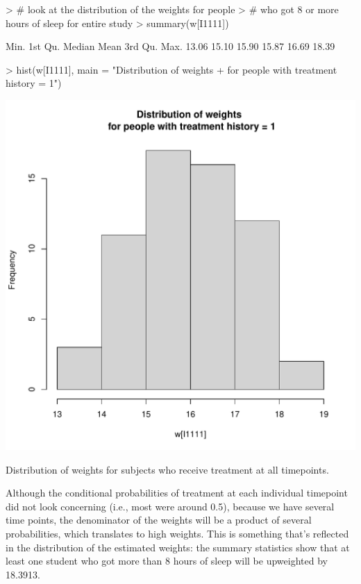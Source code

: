 \documentclass{exam}
\newenvironment{myfigure}{\captionsetup{type=mytype}}{}
\begin{document}
\begin{enumerate}
\begin{solution}
\begin{Schunk}
\begin{Sinput}
> # look at the distribution of the weights for people 
> # who got 8 or more hours of sleep for entire study
> summary(w[I1111])
\end{Sinput}
\begin{Soutput}
   Min. 1st Qu.  Median    Mean 3rd Qu.    Max. 
  13.06   15.10   15.90   15.87   16.69   18.39 
\end{Soutput}
\begin{Sinput}
> hist(w[I1111], main = "Distribution of weights 
+      for people with treatment history = 1")
\end{Sinput}
\end{Schunk}
\begin{myfigure}
\begin{center}
\includegraphics[width=.4\textwidth]{w1111Hist2.pdf}
\caption{Distribution of weights for subjects who receive treatment at all timepoints.}
\label{Fig:w1111Hist2}
\end{center}
\end{myfigure}

Although the conditional probabilities of treatment at each individual timepoint did not look concerning (i.e., most were around 0.5), because we have several time points, the denominator of the weights will be a product of several probabilities, which translates to high weights. This is something that's reflected in the distribution of the estimated weights: the summary statistics show that at least one student who got more than 8 hours of sleep will be upweighted by 18.3913. 


\end{solution}
\end{enumerate}
\end{document}
